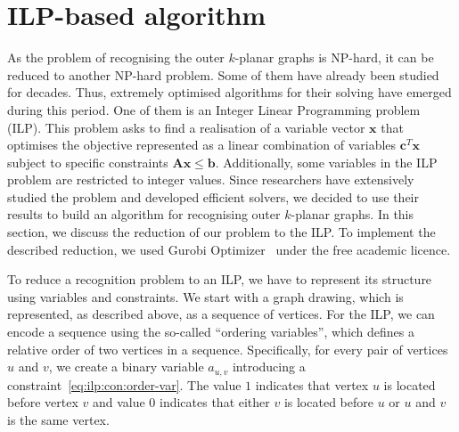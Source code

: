 \section{ILP-based algorithm}\label{sec:ILP-def}

As the problem of recognising the outer \(k\)-planar graphs is NP-hard, it can be reduced to another NP-hard problem. Some of them have already been studied for decades. Thus, extremely optimised algorithms for their solving have emerged during this period. One of them is an Integer Linear Programming problem (ILP). This problem asks to find a realisation of a variable vector \(\mathbf{x}\) that optimises the objective represented as a linear combination of variables \(\mathbf{c}^T\mathbf{x}\) subject to specific constraints \(\mathbf{Ax}\leqslant\mathbf{b}\). Additionally, some variables in the ILP problem are restricted to integer values. Since researchers have extensively studied the problem and developed efficient solvers, we decided to use their results to build an algorithm for recognising outer \(k\)-planar graphs. In this section, we discuss the reduction of our problem to the ILP\@. To implement the described reduction, we used Gurobi Optimizer~\cite{gurobi} under the free academic licence.

To reduce a recognition problem to an ILP, we have to represent its structure using variables and constraints. We start with a graph drawing, which is represented, as described above, as a sequence of vertices. For the ILP, we can encode a sequence using the so-called ``ordering variables'', which defines a relative order of two vertices in a sequence. Specifically, for every pair of vertices \(u\) and \(v\), we create a binary variable \(a_{u, v}\) introducing a constraint~\eqref{eq:ilp:con:order-var}. The value \(1\) indicates that vertex \(u\) is located before vertex \(v\) and value \(0\) indicates that either \(v\) is located before \(u\) or \(u\) and \(v\) is the same vertex.

